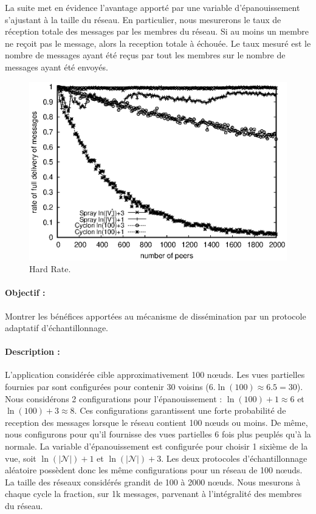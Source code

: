 La suite met en évidence l'avantage apporté par une variable d'épanouissement
s'ajustant à la taille du réseau. En particulier, nous mesurerons le taux de
réception totale des messages par les membres du réseau. Si au moins un membre
ne reçoit pas le message, alors la reception totale à échouée. Le taux mesuré
est le nombre de messages ayant été reçus par tout les membres sur le nombre de
messages ayant été envoyés.

\begin{figure}
  \begin{center}
    \includegraphics[width=.8\textwidth]{img/spray/hardrate.eps}
    \caption[Hard Rate]{\label{net:fig:hardrate} Hard Rate.}
  \end{center}
\end{figure}


\paragraph{Objectif :} Montrer les bénéfices apportées au mécanisme de
dissémination par un protocole adaptatif d'échantillonnage.
\paragraph{Description :} L'application considérée cible approximativement 100
nœuds. Les vues partielles fournies par \CYCLON sont configurées pour contenir
30 voisins ($6.\ln(100) \approx 6.5 = 30$). Nous considérons 2 configurations
pour l'épanouissement : $\ln(100)+1 \approx 6$ et $\ln(100)+3 \approx 8$. Ces
configurations garantissent une forte probabilité de reception des messages
lorsque le réseau contient 100 nœuds ou moins. De même, nous configurons \SPRAY
pour qu'il fournisse des vues partielles 6 fois plus peuplés qu'à la normale. La
variable d'épanouissement est configurée pour choisir 1 sixième de la vue, soit
$\ln(|\mathcal{N}|)+1$ et $\ln(|\mathcal{N}|)+3$.  Les deux protocoles
d'échantillonnage aléatoire possèdent donc les même configurations pour un
réseau de 100 nœuds. La taille des réseaux considérés grandit de 100 à 2000
nœuds. Nous mesurons à chaque cycle la fraction, sur 1k messages, parvenant à
l'intégralité des membres du réseau.
